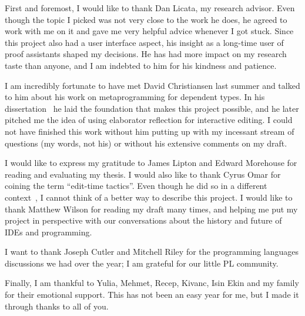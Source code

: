 \documentclass[11pt, ma]{westhesis}
\newcommand{\forceindent}{\hspace{\parindent}}
\theoremstyle{plain}
\theoremstyle{definition}
\numberwithin{section}{chapter}
\numberwithin{figure}{chapter}
\begin{document}
\begin{acknowledgements}
\forceindent First and foremost, I would like to thank Dan Licata, my research
  advisor.  Even though the topic I picked was not very close to the work he
  does, he agreed to work with me on it and gave me very helpful advice
  whenever I got stuck.  Since this project also had a user interface aspect,
  his insight as a long-time user of proof assistants shaped my decisions.  He
  has had more impact on my research taste than anyone, and I am indebted to
  him for his kindness and patience.

I am incredibly fortunate to have met David Christiansen last summer and talked
to him about his work on metaprogramming for dependent types.
In his dissertation~\cite{davidphd} he laid the foundation that makes this
project possible, and he later pitched me the idea of using elaborator
reflection for interactive editing.
I could not have finished this work without him putting up with my incessant
stream of questions (my words, not his) or without his extensive comments on my draft.

I would like to express my gratitude to James Lipton and Edward Morehouse for
reading and evaluating my thesis. I would also like to thank Cyrus Omar for
coining the term ``edit-time tactics''. Even though he did so in a different
context~\cite{hazelnut,hazelEditor}, I cannot think of a better way to describe this
project. I would like to thank Matthew Wilson for reading my draft many
times, and helping me put my project in perspective with our conversations
about the history and future of IDEs and programming.

I want to thank Joseph Cutler and Mitchell Riley for the programming languages
discussions we had over the year; I am grateful for our little PL community.

Finally, I am thankful to Yulia, Mehmet, Recep, Kivanc, Isin Ekin and
my family for their emotional support. This has not been an easy year for me,
but I made it through thanks to all of you.
\end{acknowledgements}

\frontmatter
\maketitle
\makeabstract
\makededication
\makeack

\tableofcontents

\newcommand{\nocontentsline}[3]{}
\bgroup\let\addcontentsline=\nocontentsline
\renewcommand\numberline[1]{#1.\ }
\listoffigures
\egroup

\mainmatter












\end{document}
